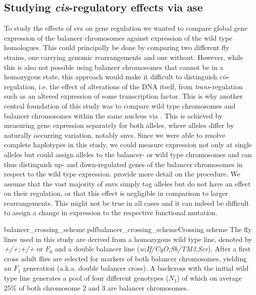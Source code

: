 \subsection{Studying \texorpdfstring{\textit{cis}}{cis}-regulatory effects via
    \texorpdfstring{\acl{ase}}{allele-specific expression}}
\label{sec:balancer_ase_motivation}

To study the effects of \acp{sv} on gene regulation we wanted to compare global
gene expression of the balancer chromosomes against expression of the wild type
homologues. This could principally be done by comparing two different fly
strains, one carrying genomic rearrangements and one without. However, while
this is also not possible using balancer chromosomes that cannot be
in a homozygous state, this approach would make it difficult to distinguish
\textit{cis}-regulation, i.e. the effect of alterations of the DNA itself, from
\textit{trans}-regulation such as an altered expression of some transcription
factor. This is why another central foundation of this study was to compare wild
type chromosomes and balancer chromosomes within the same nucleus via \ase. This
is achieved by measuring gene expression separately for both alleles, where
alleles differ by naturally occurring variation, notably \acp{snv}.
Since we were able to resolve complete haplotypes in this study, we could
measure expression not only at single alleles but could assign alleles to
the balancer- or wild type chromosomes and can thus distinguish up- and
down-regulated genes of the balancer chromosomes in respect to the wild type
expression.  provide
more detail on the procedure.
We assume that the vast majority of \acp{snv} simply tag alleles but do not have
an effect on their regulation, or that this effect is negligible in comparison
to larger rearrangements. This might not be true in all cases and it can indeed
be difficult to assign a change in expression to the respective functional
mutation.



    {balancer_crossing_scheme.pdf}{balancer_crossing_scheme}{Crossing scheme}{
        The fly lines used in this study are derived from a homozygous wild type
        line, denoted by \textit{+/+;+/+} or $F_0$ and a double balancer line
        (\textit{w;If/CyO;Sb/TM3,Ser}). After a first cross adult flies are
        selected for markers of both balancer chromosomes, yielding an $F_1$
        generation (a.k.a. double balancer cross). A backcross with the initial
        wild type line generates a pool of four different genotypes ($N_1$)
        of which on average 25\% of both chromosome 2 and 3 are balancer
        chromosomes.}



